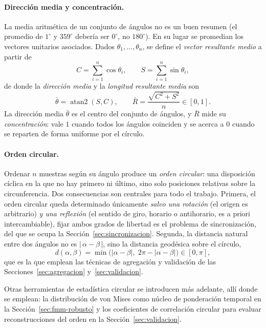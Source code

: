 \documentclass[12pt, a4paper]{report}
\begin{document}
\paragraph{Dirección media y concentración.} La media aritmética de un conjunto de ángulos no es un buen resumen (el promedio de $1^\circ$ y $359^\circ$ debería ser $0^\circ$, no $180^\circ$). En su lugar se promedian los vectores unitarios asociados. Dados $\theta_1,\dots,\theta_n$, se define el \emph{vector resultante medio} a partir de
\begin{equation}
    C = \sum_{i=1}^{n}\cos\theta_i, \qquad S = \sum_{i=1}^{n}\sin\theta_i,
    \label{eq:resultante}
\end{equation}
de donde la \emph{dirección media} y la \emph{longitud resultante media} son
\begin{equation}
    \bar\theta = \operatorname{atan2}(S, C), \qquad
    \bar R = \frac{\sqrt{C^{2}+S^{2}}}{n}\in[0,1].
    \label{eq:direccion-media}
\end{equation}
La dirección media $\bar\theta$ es el centro del conjunto de ángulos, y $\bar R$ mide su \emph{concentración}: vale $1$ cuando todos los ángulos coinciden y se acerca a $0$ cuando se reparten de forma uniforme por el círculo.

\paragraph{Orden circular.} Ordenar $n$ muestras según su ángulo produce un \emph{orden circular}: una disposición cíclica en la que no hay primero ni último, sino solo posiciones relativas sobre la circunferencia. Dos consecuencias son centrales para todo el trabajo. Primera, el orden circular queda determinado únicamente \emph{salvo una rotación} (el origen es arbitrario) \emph{y una reflexión} (el sentido de giro, horario o antihorario, es a priori intercambiable), fijar ambos grados de libertad es el problema de sincronización, del que se ocupa la Sección~\ref{sec:sincronizacion}. Segunda, la distancia natural entre dos ángulos no es $|\,\alpha-\beta\,|$, sino la distancia geodésica sobre el círculo,
\begin{equation}
    d(\alpha,\beta) = \min\big(|\alpha-\beta|,\; 2\pi - |\alpha-\beta|\big)\in[0,\pi],
    \label{eq:dist-circular}
\end{equation}
que es la que emplean las técnicas de agregación y validación de las Secciones~\ref{sec:agregacion} y~\ref{sec:validacion}.

Otras herramientas de estadística circular se introducen más adelante, allí donde se emplean: la distribución de von Mises como núcleo de ponderación temporal en la Sección~\ref{sec:fmm-robusto} y los coeficientes de correlación circular para evaluar reconstrucciones del orden en la Sección~\ref{sec:validacion}.
\end{document}
